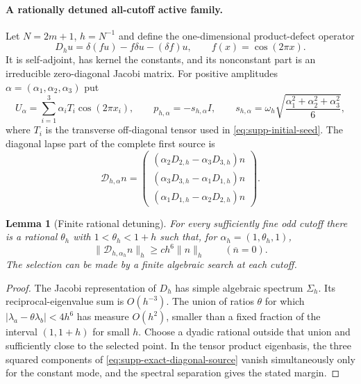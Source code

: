 \documentclass[11pt]{article}
\newtheorem{lemma}[lemma]{Lemma}
\theoremstyle{definition}
\theoremstyle{remark}
\begin{document}
\paragraph{A rationally detuned all-cutoff active family.}
Let $N=2m+1$, $h=N^{-1}$ and define the one-dimensional product-defect operator
\begin{equation}
 D_hu=\delta(fu)-f\delta u-(\delta f)u,
 \qquad f(x)=\cos(2\pi x).
 \label{eq:supp-exact-cosine-defect}
\end{equation}
It is self-adjoint, has kernel the constants, and its nonconstant part is an
irreducible zero-diagonal Jacobi matrix.  For positive amplitudes
$\alpha=(\alpha_1,\alpha_2,\alpha_3)$ put
\begin{equation}
 U_\alpha=\sum_{i=1}^3\alpha_iT_i\cos(2\pi x_i),\qquad
 p_{h,\alpha}=-s_{h,\alpha}I,
 \qquad
 s_{h,\alpha}=\omega_h\sqrt{\frac{\alpha_1^2+\alpha_2^2+\alpha_3^2}{6}},
 \label{eq:supp-exact-detuned-seed}
\end{equation}
where $T_i$ is the transverse off-diagonal tensor used in
\eqref{eq:supp-initial-seed}.  The diagonal lapse part of the complete first
source is
\begin{equation}
 \mathscr D_{h,\alpha}n=
 \begin{pmatrix}
 (\alpha_2D_{2,h}-\alpha_3D_{3,h})n\\
 (\alpha_3D_{3,h}-\alpha_1D_{1,h})n\\
 (\alpha_1D_{1,h}-\alpha_2D_{2,h})n
 \end{pmatrix}.
 \label{eq:supp-exact-diagonal-source}
\end{equation}

\begin{lemma}[Finite rational detuning]
\label{lem:supp-exact-rational-detuning}
For every sufficiently fine odd cutoff there is a rational
$\theta_h$ with $1<\theta_h<1+h$ such that, for
$\alpha_h=(1,\theta_h,1)$,
\begin{equation}
 \|\mathscr D_{h,\alpha_h}n\|_h\ge ch^6\|n\|_h
 \qquad(\overline n=0).
 \label{eq:supp-exact-diagonal-margin}
\end{equation}
The selection can be made by a finite algebraic search at each cutoff.
\end{lemma}
\begin{proof}
The Jacobi representation of $D_h$ has simple algebraic spectrum
$\Sigma_h$.  Its reciprocal-eigenvalue sum is $O(h^{-3})$.  The union of
ratios $\theta$ for which
$|\lambda_a-\theta\lambda_b|<4h^6$ has measure $O(h^2)$, smaller than a
fixed fraction of the interval $(1,1+h)$ for small $h$.  Choose a dyadic
rational outside that union and sufficiently close to the selected point.
In the tensor product eigenbasis, the three squared components of
\eqref{eq:supp-exact-diagonal-source} vanish simultaneously only for the
constant mode, and the spectral separation gives the stated margin.
\end{proof}
\end{document}
